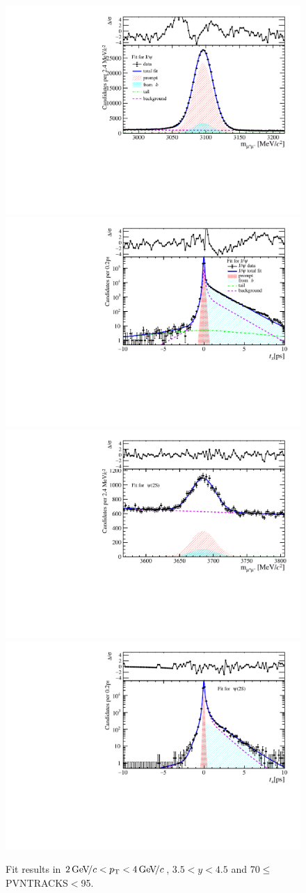 \begin{figure}[H]
\begin{center}
\includegraphics[width=0.47\linewidth]{pdf/Jpsi/drawmass/n4y3pt2.pdf}
\includegraphics[width=0.47\linewidth]{pdf/Jpsi/2DFit/n4y3pt2.pdf}
\vspace*{-0.5cm}
\includegraphics[width=0.47\linewidth]{pdf/Psi2S/drawmass/n4y3pt2.pdf}
\includegraphics[width=0.47\linewidth]{pdf/Psi2S/2DFit/n4y3pt2.pdf}
\vspace*{-0.5cm}
\end{center}
\caption{Fit results in $2\text{\,Ge\kern -0.1em V\!/}c<p_{\mathrm{T}}<4\text{\,Ge\kern -0.1em V\!/}c$, $3.5<y<4.5$ and 70$\leq$PVNTRACKS$<$95.}
\label{Fitn4y3pt2}
\end{figure}
